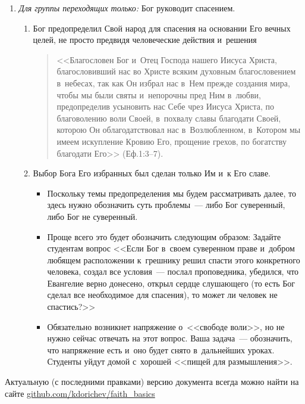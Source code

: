 \documentclass[a4paper,12pt]{article}
\begin{document}
\begin{enumerate}
\begin{itemize}
\begin{enumerate}
        \item \emph{Для группы переходящих только:} Бог руководит спасением.
        \begin{enumerate}
            \item Бог предопределил Свой народ для спасения на основании Его вечных целей, не просто предвидя человеческие действия и~решения 
            \begin{quote}
            <<Благословен Бог и~Отец Господа нашего Иисуса Христа, благословивший нас во Христе всяким духовным благословением в~небесах, так как Он избрал нас в~Нем прежде создания мира, чтобы мы были святы и~непорочны пред Ним в~любви, предопределив усыновить нас Себе чрез Иисуса Христа, по благоволению воли Своей, в~похвалу славы благодати Своей, которою Он облагодатствовал нас в~Возлюбленном, в~Котором мы имеем искупление Кровию Его, прощение грехов, по богатству благодати Его>> (Еф.1:3--7).
            \end{quote}
            \item Выбор Бога Его избранных был сделан только Им и~к Его славе.
            \begin{itemize}
                \item Поскольку темы предопределения мы будем рассматривать далее, то здесь нужно обозначить суть проблемы~--- либо Бог суверенный, либо Бог не суверенный. 
                \item Проще всего это будет обозначить следующим образом: Задайте студентам вопрос <<Если Бог в~своем суверенном праве и~добром любящем расположении к~грешнику решил спасти этого конкретного человека, создал все условия~--- послал проповедника, убедился, что Евангелие верно донесено, открыл сердце слушающего (то есть Бог сделал все необходимое для спасения), то может ли человек не спастись?>> 
                \item Обязательно возникнет напряжение о~<<свободе воли>>, но не нужно сейчас отвечать на этот вопрос. Ваша задача~--- обозначить, что напряжение есть и~оно будет снято в~дальнейших уроках. Студенты уйдут домой с~хорошей <<пищей для размышления>>.
            \end{itemize}
        \end{enumerate}
    \end{enumerate}
    \end{itemize}
\end{enumerate}

\vfill
\tiny{Актуальную (с последними правками) версию документа всегда можно найти на сайте \href{https://github.com/kdorichev/faith_basics/blob/main/God/lesson_3.5.pdf}{github.com/kdorichev/faith\_basics}}
\end{document}
